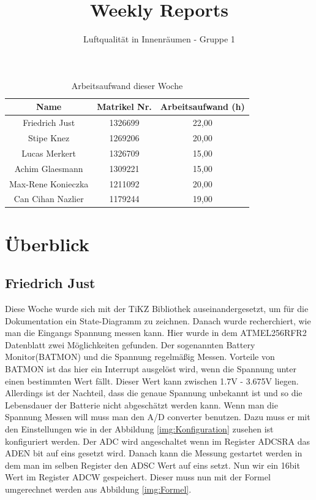 \documentclass[]{article}
\title{Weekly Reports}
\author{Luftqualität in Innenräumen - Gruppe 1}
\begin{document}
\maketitle

\begin{table}[h!]
	\centering
	\begin{tabular}{|c|c|c|}
		\hline
		{\textbf{Name}}				&		{\textbf{Matrikel Nr.}} & {\textbf{Arbeitsaufwand (h)}} \\
		\hline
		Friedrich Just				&		1326699 				&		22,00\\
		\hline
		Stipe Knez					&		1269206 				&	20,00	\\
		\hline
		Lucas Merkert				&		1326709					&	15,00	\\
		\hline
		Achim Glaesmann				&		1309221					&		15,00\\
		\hline
		Max-Rene Konieczka			&		1211092					&	20,00	\\
		\hline
		Can Cihan Nazlier			&		1179244					&	19,00	\\
		\hline
	\end{tabular}
	\caption{Arbeitsaufwand dieser Woche}
	\label{tab:worakload}
\end{table}



\section{Überblick}


\subsection{Friedrich Just}

Diese Woche wurde sich mit der TiKZ Bibliothek auseinandergesetzt, um für die Dokumentation ein State-Diagramm zu zeichnen. Danach wurde recherchiert, wie man die Eingangs Spannung messen kann. Hier wurde in dem ATMEL256RFR2 Datenblatt\cite{ATmegaDatasheet} zwei Möglichkeiten gefunden. Der sogenannten Battery Monitor(BATMON) und die Spannung regelmäßig Messen. Vorteile von BATMON ist das hier ein Interrupt ausgelöst wird, wenn die Spannung unter einen bestimmten Wert fällt. Dieser Wert kann zwischen 1.7V - 3.675V liegen. Allerdings ist der Nachteil, dass die genaue Spannung unbekannt ist und so die Lebensdauer der Batterie nicht abgeschätzt werden kann. Wenn man die Spannung Messen will muss man den A/D converter benutzen. Dazu muss er mit den Einstellungen wie in der Abbildung \ref{img:Konfiguration} zusehen ist konfiguriert werden. Der ADC wird angeschaltet wenn im Register ADCSRA das ADEN bit auf eins gesetzt wird. Danach kann die Messung gestartet werden in dem man im selben Register den ADSC Wert auf eins setzt. Nun wir ein 16bit Wert im Register ADCW gespeichert. Dieser muss nun mit der Formel umgerechnet werden aus Abbildung  \ref{img:Formel}.
\end{document}
